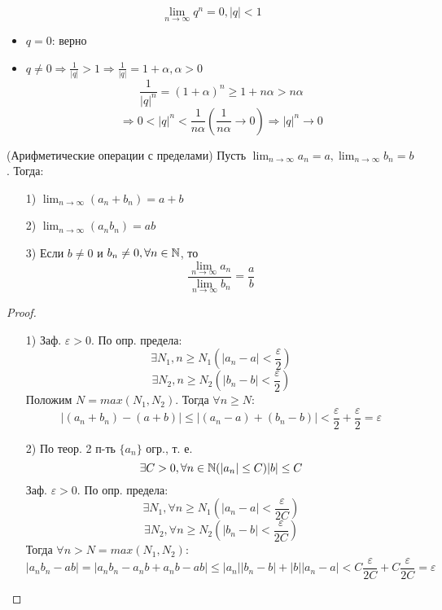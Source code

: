 \begin{example}
\[
\lim_{n\to\infty} q^{n} = 0, |q| < 1
\] 
\begin{itemize}
    \item $q = 0$: верно
    \item $q \neq 0 \Rightarrow \frac{1}{|q|} > 1 \Rightarrow \frac{1}{|q|} = 1 + \alpha, \alpha > 0$
        \[
        \frac{1}{|q|^{n}} = (1 + \alpha)^{n} \geq 1 + n\alpha > n\alpha
        \] 
        \[
        \Rightarrow 0 < |q|^{n} < \frac{1}{n\alpha} (\frac{1}{n\alpha} \rightarrow 0) \Rightarrow |q|^{n} \rightarrow 0
        \] 
\end{itemize}
\end{example}
\begin{theorem}(Арифметические операции с пределами)
Пусть $\lim_{n\to\infty}a_n = a, \lim_{n\to\infty}b_n = b$. Тогда:
\begin{enumerate}
    \item [1) ] $\lim_{n\to\infty}(a_n + b_n) = a + b$ 
    \item [2) ] $\lim_{n\to\infty}(a_n b_n) = ab$
    \item [3) ] Если $b \neq 0$ и $b_n \neq 0, \forall n \in \mathbb{N}$, то
        \[
            \frac{\lim_{n\to\infty}a_n}{\lim_{n\to\infty}b_n} = \frac{a}{b}
        \]
\end{enumerate}
\end{theorem}
\begin{proof}
    \begin{enumerate}
        \item [1) ] Заф. $\varepsilon > 0$. По опр. предела:
            \[
            \exists N_1, n \geq N_1 (|a_n - a| < \frac{\varepsilon}{2})
            \] 
            \[
            \exists N_2, n \geq N_2 (|b_n - b| < \frac{\varepsilon}{2})
            \] 
            Положим $N = max(N_1, N_2)$. Тогда $\forall n \geq N\colon $
            \[
            |(a_n + b_n) -(a + b)| \leq |(a_n - a) + (b_n - b)| < \frac{\varepsilon}{2} + \frac{\varepsilon}{2} = \varepsilon
            \] 
        \item [2) ] По теор. 2 п-ть $\{a_n\}$ огр., т. е.
            \[
            \exists C > 0, \forall n \in \mathbb{N} (|a_n| \leq C) |b| \leq C
            \] 
            Заф. $\varepsilon > 0$. По опр. предела:
            \[
            \exists N_1, \forall n \geq N_1 (|a_n - a| < \frac{\varepsilon}{2C})
            \] 
            \[
            \exists N_2, \forall n \geq N_2 (|b_n - b| < \frac{\varepsilon}{2C})
            \] 
            Тогда $\forall n > N = max(N_1, N_2)$:
\[
|a_n b_n - ab| = |a_n b_n -a_n b + a_n b - ab| \leq |a_n||b_n - b| + |b||a_n - a| < C \frac{\varepsilon}{2C} + C \frac{\varepsilon}{2C} = \varepsilon
\] 
    \end{enumerate}
\end{proof}
